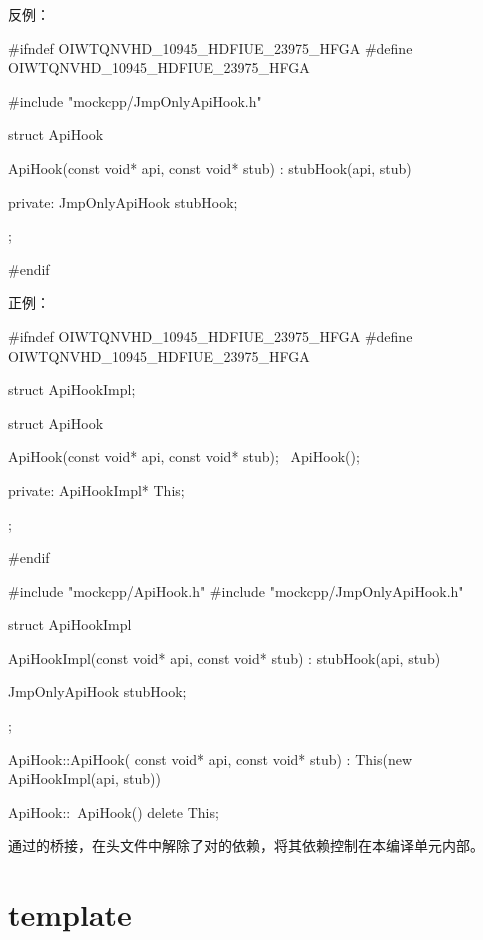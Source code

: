 \begin{content}
反例：
\begin{leftbar}
\begin{c++}[caption={mockcpp/ApiHook.h}]
#ifndef OIWTQNVHD_10945_HDFIUE_23975_HFGA
#define OIWTQNVHD_10945_HDFIUE_23975_HFGA

#include "mockcpp/JmpOnlyApiHook.h"

struct ApiHook
{
    ApiHook(const void* api, const void* stub)
      : stubHook(api, stub)
    {}

private:
    JmpOnlyApiHook stubHook;
};

#endif
\end{c++}
\end{leftbar}

正例：
\begin{leftbar}
\begin{c++}[caption={mockcpp/ApiHook.h}]
#ifndef OIWTQNVHD_10945_HDFIUE_23975_HFGA
#define OIWTQNVHD_10945_HDFIUE_23975_HFGA

struct ApiHookImpl;

struct ApiHook
{
    ApiHook(const void* api, const void* stub);
    ~ApiHook();

private:
    ApiHookImpl* This;
};

#endif
\end{c++}
\end{leftbar}

\begin{leftbar}
\begin{c++}[caption={mockcpp/ApiHook.cpp}]
#include "mockcpp/ApiHook.h"
#include "mockcpp/JmpOnlyApiHook.h"

struct ApiHookImpl
{
   ApiHookImpl(const void* api, const void* stub)
     : stubHook(api, stub)
   {
   }

   JmpOnlyApiHook stubHook;
};

ApiHook::ApiHook( const void* api, const void* stub)
  : This(new ApiHookImpl(api, stub))
{
}

ApiHook::~ApiHook()
{
    delete This;
}
\end{c++}
\end{leftbar}

通过的桥接，在头文件中解除了对的依赖，将其依赖控制在本编译单元内部。

\end{content}

\section{template}

